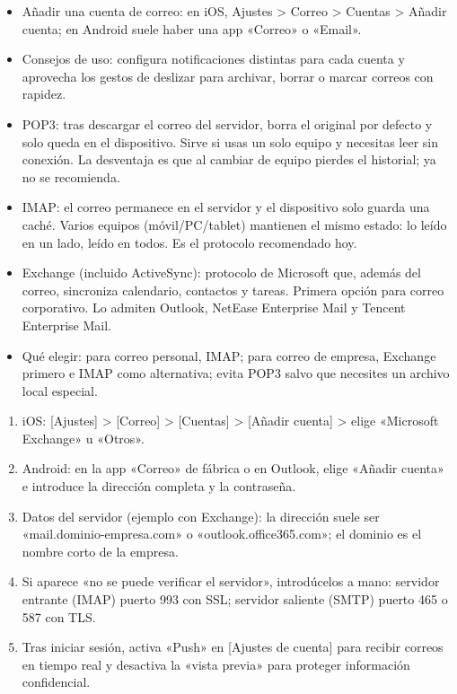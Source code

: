 
\begin{itemize}
  \item Añadir una cuenta de correo: en iOS, Ajustes > Correo > Cuentas > Añadir cuenta; en Android suele haber una app «Correo» o «Email».
  \item Consejos de uso: configura notificaciones distintas para cada cuenta y aprovecha los gestos de deslizar para archivar, borrar o marcar correos con rapidez.
\end{itemize}


\begin{itemize}
  \item POP3: tras descargar el correo del servidor, borra el original por defecto y solo queda en el dispositivo. Sirve si usas un solo equipo y necesitas leer sin conexión. La desventaja es que al cambiar de equipo pierdes el historial; ya no se recomienda.
  \item IMAP: el correo permanece en el servidor y el dispositivo solo guarda una caché. Varios equipos (móvil/PC/tablet) mantienen el mismo estado: lo leído en un lado, leído en todos. Es el protocolo recomendado hoy.
  \item Exchange (incluido ActiveSync): protocolo de Microsoft que, además del correo, sincroniza calendario, contactos y tareas. Primera opción para correo corporativo. Lo admiten Outlook, NetEase Enterprise Mail y Tencent Enterprise Mail.
  \item Qué elegir: para correo personal, IMAP; para correo de empresa, Exchange primero e IMAP como alternativa; evita POP3 salvo que necesites un archivo local especial.
\end{itemize}


\begin{enumerate}
  \item iOS: [Ajustes] > [Correo] > [Cuentas] > [Añadir cuenta] > elige «Microsoft Exchange» u «Otros».
  \item Android: en la app «Correo» de fábrica o en Outlook, elige «Añadir cuenta» e introduce la dirección completa y la contraseña.
  \item Datos del servidor (ejemplo con Exchange): la dirección suele ser «mail.dominio-empresa.com» o «outlook.office365.com»; el dominio es el nombre corto de la empresa.
  \item Si aparece «no se puede verificar el servidor», introdúcelos a mano: servidor entrante (IMAP) puerto 993 con SSL; servidor saliente (SMTP) puerto 465 o 587 con TLS.
  \item Tras iniciar sesión, activa «Push» en [Ajustes de cuenta] para recibir correos en tiempo real y desactiva la «vista previa» para proteger información confidencial.
\end{enumerate}

